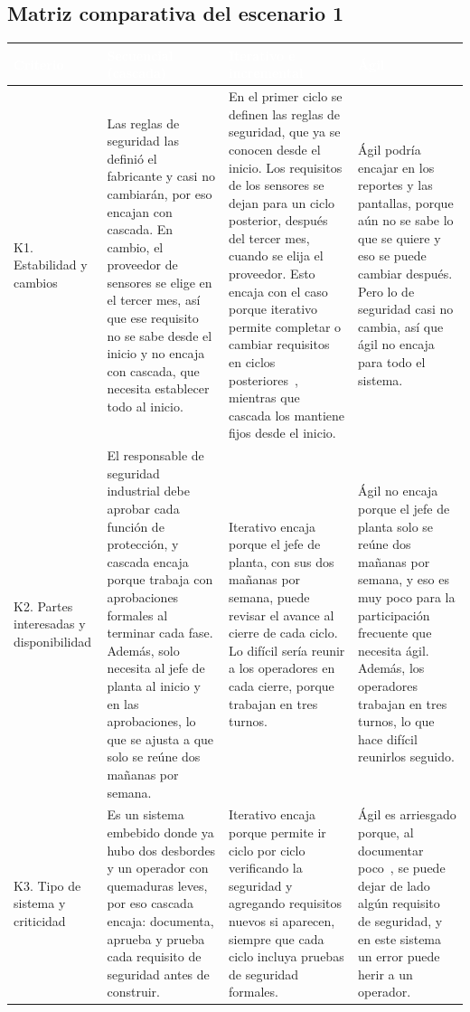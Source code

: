 \subsection{Matriz comparativa del escenario 1}

{\small
\begin{xltabular}{\textwidth}{|>{\raggedright\arraybackslash}p{2.6cm}|L|L|L|}
\hline
{}\textcolor{white}{\textbf{Criterio}} & \textcolor{white}{\textbf{Secuencial (cascada)}} & \textcolor{white}{\textbf{Iterativo e incremental}} & \textcolor{white}{\textbf{Ágil}} \\ \hline
\endhead
K1. Estabilidad y cambios & Las reglas de seguridad las definió el fabricante y casi no cambiarán, por eso encajan con cascada. En cambio, el proveedor de sensores se elige en el tercer mes, así que ese requisito no se sabe desde el inicio y no encaja con cascada, que necesita establecer todo al inicio. & En el primer ciclo se definen las reglas de seguridad, que ya se conocen desde el inicio. Los requisitos de los sensores se dejan para un ciclo posterior, después del tercer mes, cuando se elija el proveedor. Esto encaja con el caso porque iterativo permite completar o cambiar requisitos en ciclos posteriores~\cite{larman2003}, mientras que cascada los mantiene fijos desde el inicio. & Ágil podría encajar en los reportes y las pantallas, porque aún no se sabe lo que se quiere y eso se puede cambiar después. Pero lo de seguridad casi no cambia, así que ágil no encaja para todo el sistema. \\ \hline
K2. Partes interesadas y disponibilidad & El responsable de seguridad industrial debe aprobar cada función de protección, y cascada encaja porque trabaja con aprobaciones formales al terminar cada fase. Además, solo necesita al jefe de planta al inicio y en las aprobaciones, lo que se ajusta a que solo se reúne dos mañanas por semana. & Iterativo encaja porque el jefe de planta, con sus dos mañanas por semana, puede revisar el avance al cierre de cada ciclo. Lo difícil sería reunir a los operadores en cada cierre, porque trabajan en tres turnos. & Ágil no encaja porque el jefe de planta solo se reúne dos mañanas por semana, y eso es muy poco para la participación frecuente que necesita ágil. Además, los operadores trabajan en tres turnos, lo que hace difícil reunirlos seguido. \\ \hline
K3. Tipo de sistema y criticidad & Es un sistema embebido donde ya hubo dos desbordes y un operador con quemaduras leves, por eso cascada encaja: documenta, aprueba y prueba cada requisito de seguridad antes de construir. & Iterativo encaja porque permite ir ciclo por ciclo verificando la seguridad y agregando requisitos nuevos si aparecen, siempre que cada ciclo incluya pruebas de seguridad formales. & Ágil es arriesgado porque, al documentar poco~\cite{inayat2015, heeager2018}, se puede dejar de lado algún requisito de seguridad, y en este sistema un error puede herir a un operador. \\ \hline

\end{xltabular}}
